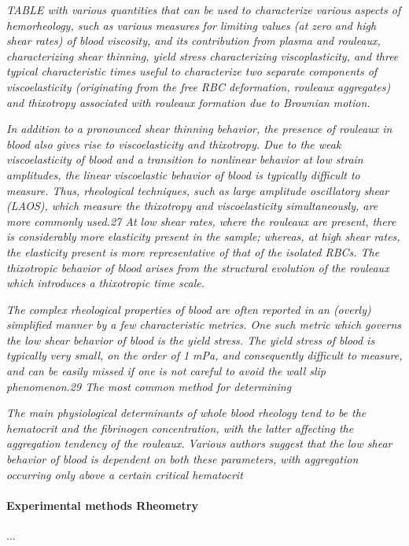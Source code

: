 \documentclass[11pt,letterpaper]{article}
\begin{document}
\textit{TABLE with various quantities that can be used to characterize various aspects of hemorheology, such as various measures for limiting values (at zero and high shear rates) of blood viscosity, and its contribution from plasma and rouleaux, characterizing shear thinning, yield stress characterizing viscoplasticity, and three typical characteristic times useful to characterize two separate components of viscoelasticity (originating from the free RBC deformation, rouleaux aggregates) and thixotropy associated with rouleaux formation due to Brownian motion.}

\textit{In addition to a pronounced shear thinning behavior, the
presence of rouleaux in blood also gives rise to viscoelasticity and thixotropy. Due to the weak viscoelasticity of blood and a transition to nonlinear behavior at low strain amplitudes, the linear viscoelastic behavior of blood is typically difficult to measure. Thus, rheological techniques, such as large amplitude oscillatory shear (LAOS), which measure the thixotropy and viscoelasticity simultaneously, are more commonly used.27 At low shear rates, where the rouleaux are present, there is considerably more elasticity present in the sample; whereas, at high shear rates, the elasticity present is more representative of that of the isolated RBCs. The thixotropic behavior of blood arises from the structural evolution of the rouleaux which introduces a thixotropic time scale.}

 \textit{The complex rheological properties of blood are often
reported in an (overly) simplified manner by a few characteristic metrics. One such metric which governs the low shear behavior of blood is the yield stress. The yield stress of blood is typically very small, on the order of 1 mPa, and consequently difficult to measure, and can be easily missed if one is not careful to avoid the wall slip phenomenon.29 The most common method for determining}


\textit{The main physiological determinants of whole blood rheology
tend to be the hematocrit and the fibrinogen concentration, with the latter affecting the aggregation tendency of the rouleaux. Various authors suggest that the low shear behavior of blood is dependent on both these parameters, with aggregation occurring only above a certain critical hematocrit}


\paragraph{Experimental methods
Rheometry}...
\end{document}
